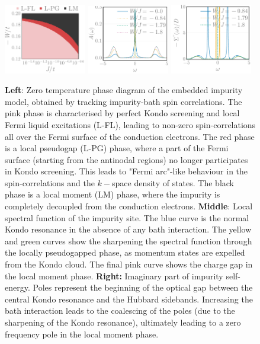 \documentclass[reprint,hidelinks,onecolumn]{revtex4-2}
\begin{document}
\begin{figure}[htpb]
	\centering
	\includegraphics[width=0.32\textwidth]{phaseDiagram.pdf}
	\includegraphics[width=0.32\textwidth]{impSpecFunc_49-1000.pdf}
	\includegraphics[width=0.32\textwidth]{sigmaImag_49-1000.pdf}
	\caption{{\bf Left}: Zero temperature phase diagram of the embedded impurity model, obtained by tracking impurity-bath spin correlations. The pink phase is characterised by perfect Kondo screening and local Fermi liquid excitations (L-FL), leading to non-zero spin-correlations all over the Fermi surface of the conduction electrons. The red phase is a local pseudogap (L-PG)  phase, where a part of the Fermi surface (starting from the antinodal regions) no longer participates in Kondo screening. This leads to "Fermi arc"-like behaviour in the spin-correlations and the \(k-\)space density of states. The black phase is a local moment (LM) phase, where the impurity is completely decoupled from the conduction electrons. {\bf Middle}: Local spectral function of the impurity site. The blue curve is the normal Kondo resonance in the absence of any bath interaction. The yellow and green curves show the sharpening the spectral function through the locally pseudogapped phase, as momentum states are expelled from the Kondo cloud. The final pink curve shows the charge gap in the local moment phase. {\bf Right:} Imaginary part of impurity self-energy. Poles represent the beginning of the optical gap between the central Kondo resonance and the Hubbard sidebands. Increasing the bath interaction leads to the coalescing of the poles (due to the sharpening of the Kondo resonance), ultimately leading to a zero frequency pole  in the local moment phase.}
	\label{phaseDiagram}
\end{figure}
\end{document}
